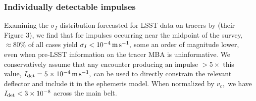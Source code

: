 \documentclass[linenumbers, onecolumn]{aastex631}
\newcommand\edited[1]{{\color{red} {#1}}}
\newcommand{\bhat}{\mathbf{\hat b}}
\begin{document}



\subsubsection{Individually detectable impulses}
Examining the $\sigma_I$ distribution forecasted for LSST data on
tracers by \citet{negin} \edited{(their Figure 3)}, we find that for impulses occurring near the midpoint of the survey, $\approx80\%$ of all cases yield $\sigma_I<10^{-4}\,{\rm m}\,{\rm
  s}^{-1},$ some an order of magnitude lower, \edited{even when pre-LSST information on
the tracer MBA is uninformative.}  We conservatively
assume that any encounter producing  an impulse $>5\times$ this value, $I_{\rm det}=5\times 10^{-4}\,{\rm m}\,{\rm
  s}^{-1},$ can be used to directly constrain the relevant deflector and include it in the ephemeris model.
When normalized by $v_c,$ we have \edited{$I_{\rm  det}<3\times10^{-8}$ across the main belt.}
\end{document}
